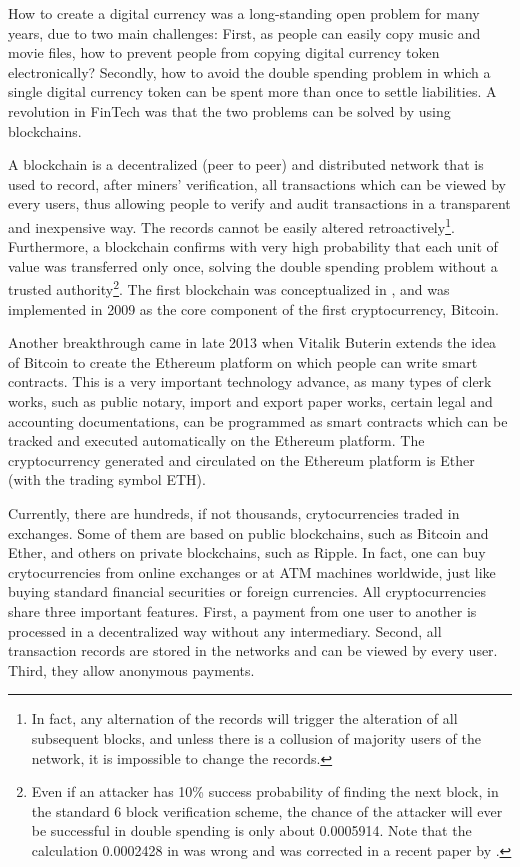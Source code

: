 \documentclass[draft, noinfoline]{ectaart}
\numberwithin{equation}{section}
\theoremstyle{plain}
\begin{document}
How to create a digital currency was a long-standing open problem for many years, due to two main challenges: First, as people can easily copy music and movie files, how to prevent people from copying digital currency token electronically? Secondly, how to avoid the double spending problem in which a single digital currency token can be spent more than once to settle liabilities. A revolution in FinTech was that the two problems can be solved by using blockchains.

A blockchain is a decentralized (peer to peer) and distributed network that is used to record, after miners' verification, all transactions which can be viewed by every users, thus allowing people to verify and audit transactions in a transparent and inexpensive way. The records cannot be easily altered retroactively\footnote{In fact, any alternation of the records will trigger the alteration of all subsequent blocks, and unless there is a collusion of majority users of the network, it is impossible to change the records.}. Furthermore, a blockchain confirms with very high probability that each unit of value was transferred only once, solving the  double spending problem without a trusted authority\footnote{Even if an attacker has 10\% success probability of finding the next block, in the standard 6 block verification scheme, the chance of the attacker will ever be successful in double spending is only about 0.0005914. Note that the calculation 0.0002428 in \cite{nakamoto_bitcoin:_2008} was wrong and was corrected in a recent paper by \cite{Grunspan_2018}.}. The first blockchain was conceptualized in \cite{nakamoto_bitcoin:_2008}, and was implemented in 2009 as the core component of the first cryptocurrency, Bitcoin.

Another breakthrough came in late 2013 when Vitalik Buterin extends the idea of Bitcoin to create the Ethereum platform on which people can write smart contracts. This is a very important technology advance, as many types of clerk works, such as public notary, import and export paper works, certain legal and accounting documentations, can be
programmed as smart contracts which can be tracked and executed automatically on the Ethereum platform. The cryptocurrency generated and circulated on the Ethereum platform is Ether (with the trading symbol ETH).

Currently, there are hundreds, if not thousands, crytocurrencies traded in exchanges. Some of them are based on public blockchains, such as Bitcoin and Ether, and others on private blockchains, such as Ripple. In fact, one can buy crytocurrencies from online exchanges or at ATM machines worldwide, just like buying standard financial securities or foreign currencies.  All cryptocurrencies share three important features. First, a payment from one user to another is processed in a decentralized way without any intermediary. Second, all transaction records are stored in the networks and can be viewed by every user. Third, they allow anonymous payments.
\end{document}
